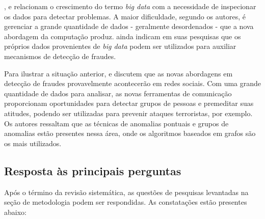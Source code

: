 \documentclass[smallextended]{svjour3}
\begin{document}
\cite{Feily2009}, \cite{Mahmood2013} e \cite{Sharma2015} relacionam o crescimento do termo \emph{big data} com a necessidade de inspecionar os dados para detectar problemas. A maior dificuldade, segundo os autores, é gerenciar a grande quantidade de dados - geralmente desordenados - que a nova abordagem da computação produz. \cite{Sharma2015} ainda indicam em suas pesquisas que os próprios dados provenientes de \emph{big data} podem ser utilizados para auxiliar mecanismos de detecção de fraudes.     

Para ilustrar a situação anterior, \cite{Liu2015} e \cite{Yu2016} discutem que as novas abordagens em detecção de fraudes provavelmente acontecerão em redes sociais. Com uma grande quantidade de dados para analisar, as novas ferramentas de comunicação proporcionam oportunidades para detectar grupos de pessoas e premeditar suas atitudes, podendo ser utilizadas para prevenir ataques terroristas, por exemplo. Os autores ressaltam que as técnicas de anomalias pontuais e grupos de anomalias estão presentes nessa área, onde os algoritmos baseados em grafos são os mais utilizados.


\subsection{Resposta às principais perguntas}

Após o término da revisão sistemática, as questões de pesquisas levantadas na seção de metodologia podem ser respondidas. As constatações estão presentes abaixo:
\end{document}

